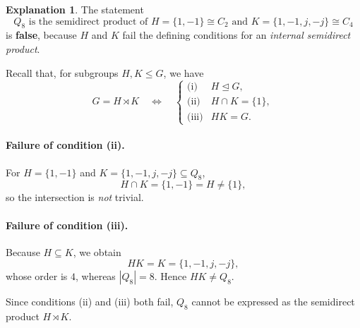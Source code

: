 \documentclass[12pt]{article}
\theoremstyle{definition} %
\newtheorem{explanation}{Explanation}
\theoremstyle{plain} %
\begin{document}
\begin{explanation}
  The statement  
  \[
     Q_{8} \text{ is the semidirect product of }
     H=\{1,-1\}\cong C_{2} 
     \text{ and }
     K=\{1,-1,j,-j\}\cong C_{4}
  \]
  is \textbf{false}, because \(H\) and \(K\) fail the defining
  conditions for an \emph{internal semidirect product}.

  \medskip
  Recall that, for subgroups \(H,K\le G\), we have
  \[
     G = H\rtimes K
     \quad\Longleftrightarrow\quad
     \begin{cases}
        \text{(i)} & H\unlhd G,\\
        \text{(ii)}& H\cap K=\{1\},\\
        \text{(iii)}& HK=G.
     \end{cases}
  \]

  \paragraph{Failure of condition (ii).}
  For \(H=\{1,-1\}\) and \(K=\{1,-1,j,-j\}\subseteq Q_{8}\),
  \[
     H\cap K = \{1,-1\}= H \neq \{1\},
  \]
  so the intersection is \emph{not} trivial.

  \paragraph{Failure of condition (iii).}
  Because \(H\subseteq K\), we obtain
  \[
     HK = K = \{1,-1,j,-j\},
  \]
  whose order is \(4\), whereas \(|Q_{8}|=8\).
  Hence \(HK\neq Q_{8}\).

  \medskip
  Since conditions (ii) and (iii) both fail, \(Q_{8}\) cannot be
  expressed as the semidirect product \(H\rtimes K\).
\end{explanation}
\end{document}
